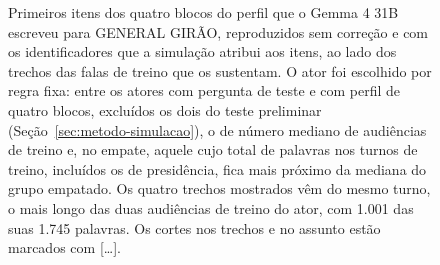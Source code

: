 \begin{figure}[!t]
  \caption{Primeiros itens dos quatro blocos do perfil que o Gemma 4 31B escreveu para GENERAL
  GIRÃO, reproduzidos sem correção e com os identificadores que a simulação atribui aos itens, ao lado dos
  trechos das falas de treino que os sustentam. O ator foi
  escolhido por regra fixa: entre os atores com pergunta de teste e com perfil de quatro blocos,
  excluídos os dois do teste preliminar (Seção~\ref{sec:metodo-simulacao}), o de número mediano de
  audiências de treino e, no empate, aquele cujo total de palavras nos turnos de treino, incluídos os
  de presidência, fica mais próximo da mediana do grupo empatado. Os quatro trechos mostrados vêm do
  mesmo turno, o mais longo das duas audiências de treino do ator, com 1.001 das suas 1.745 palavras.
  Os cortes nos trechos e no assunto estão marcados com {[\ldots]}.}
  \label{fig:perfil}
\end{figure}
